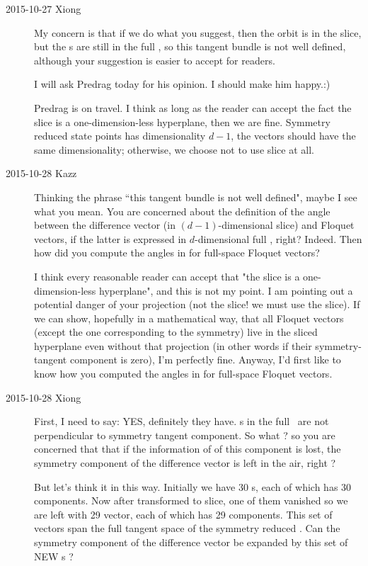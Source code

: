 \begin{description}
\item[2015-10-27 Xiong]
My concern is that if we do what you suggest, then the orbit is in
the slice, but the \Fv s are still in the full \statesp, so
this tangent bundle is not well defined, although your suggestion
is easier to accept for readers.

I will ask Predrag today for his opinion. I should make him happy.:)

Predrag is on travel. I think as long as the reader can accept the
fact the slice is a one-dimension-less hyperplane, then we are fine.
Symmetry reduced state points has dimensionality $d-1$, the vectors
should have the same dimensionality; otherwise, we choose not to use
slice at all.

\item[2015-10-28 Kazz]
Thinking the phrase ``this tangent bundle is not well defined", maybe I
see what you mean. You are concerned about the definition of the angle
between the difference vector (in $(d-1)$-dimensional slice) and Floquet
vectors, if the latter is expressed in $d$-dimensional full \statesp,
right? Indeed. Then how did you compute the angles in
 for full-space Floquet vectors?

I think every reasonable reader can accept that "the slice is a one-dimension-less hyperplane", and this is not my point. I am pointing out a potential danger of your projection (not the slice! we must use the slice). If we can show, hopefully in a mathematical way, that all Floquet vectors (except the one corresponding to the symmetry) live in the sliced hyperplane even without that projection (in other words if their symmetry-tangent component is zero), I'm perfectly fine. Anyway, I'd first like to know how you computed the angles in  for full-space Floquet vectors.

\item[2015-10-28 Xiong]
First, I need to say: YES, definitely they have. \Fv s in the full
\statesp\ are not perpendicular to symmetry tangent component. So what ?
so you are concerned that that if the information of of this component is
lost, the symmetry component of the difference vector is left in the air,
right ?

But let's
think it in this way. Initially we have 30 \Fv s, each of which has
30 components. Now after transformed to slice, one of them vanished so
we are left with 29 vector, each of which has 29 components. This set
of vectors span the full tangent space of the symmetry reduced \statesp.
Can the symmetry component of the difference vector be expanded
by this set of NEW \Fv s ?


\end{description}
